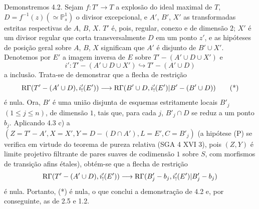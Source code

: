 Demonstremos 4.2. Sejam $f:T'\to T$ a explosão do ideal maximal de $T$, $D=f^{-1}(z)(\simeq\mathbb P^1_s)$ o divisor excepcional, e $A'$, $B'$, $X'$ as transformadas estritas respectivas de $A$, $B$, $X$. $T'$ é, pois, regular, conexo e de dimensão $2$; $X'$ é um divisor regular que corta transversalmente $D$ em um ponto $z'$, e as hipóteses de posição geral sobre $A$, $B$, $X$ significam que $A'$ é disjunto de $B'\cup X'$. Denotemos por $E'$ a imagem inversa de $E$ sobre $T'-(A'\cup D\cup X')$ e
\[
i':T'-(A'\cup D\cup X')\hookrightarrow T'-(A'\cup D)
\]
a inclusão. Trata-se de demonstrar que a flecha de restrição
\begin{equation}
\mathrm{R}\Gamma(T'-(A'\cup D),i'_!(E'))
\longrightarrow
\mathrm{R}\Gamma(B'\cup D,i'_!(E')|B'-(B'\cup D))
\tag{*}
\end{equation}
é nula. Ora, $B'$ é uma união disjunta de esquemas estritamente locais $B'_j$ $(1\le j\le n)$, de dimensão $1$, tais que, para cada $j$, $B'_j\cap D$ se reduz a um ponto $b_j$. Aplicando 4.3 c) a $(Z=T'-A', X=X', Y=D-(D\cap A'), L=E', C=B'_j)$ (a hipótese (P) se verifica em virtude do teorema de pureza relativa (SGA 4 XVI 3), pois $(Z,Y)$ é limite projetivo filtrante de pares suaves de codimensão $1$ sobre $S$, com morfismos de transição afins étales), obtém-se que a flecha de restrição
\[
\mathrm{R}\Gamma(T'-(A'\cup D),i'_!(E'))
\longrightarrow
\mathrm{R}\Gamma(B'_j-b_j,i'_!(E')|B'_j-b_j)
\]
é nula. Portanto, (*) é nula, o que conclui a demonstração de 4.2 e, por conseguinte, as de 2.5 e 1.2.
